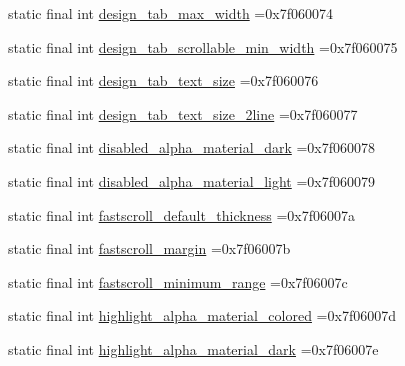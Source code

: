\begin{DoxyCompactItemize}
\item 
static final int \mbox{\hyperlink{classbr_1_1unb_1_1cic_1_1mp_1_1marketmaster_1_1test_1_1R_1_1dimen_ae7b103c763e5dfab15c7117e9487fca4}{design\+\_\+tab\+\_\+max\+\_\+width}} =0x7f060074
\item 
static final int \mbox{\hyperlink{classbr_1_1unb_1_1cic_1_1mp_1_1marketmaster_1_1test_1_1R_1_1dimen_a0eddb231df09cd5f0bbad195decf5a47}{design\+\_\+tab\+\_\+scrollable\+\_\+min\+\_\+width}} =0x7f060075
\item 
static final int \mbox{\hyperlink{classbr_1_1unb_1_1cic_1_1mp_1_1marketmaster_1_1test_1_1R_1_1dimen_a6175e1ce284fd02037c988a3cf335c77}{design\+\_\+tab\+\_\+text\+\_\+size}} =0x7f060076
\item 
static final int \mbox{\hyperlink{classbr_1_1unb_1_1cic_1_1mp_1_1marketmaster_1_1test_1_1R_1_1dimen_a8ba7b38c10c90a08ab5866428f89f3fb}{design\+\_\+tab\+\_\+text\+\_\+size\+\_\+2line}} =0x7f060077
\item 
static final int \mbox{\hyperlink{classbr_1_1unb_1_1cic_1_1mp_1_1marketmaster_1_1test_1_1R_1_1dimen_acdc59e7a84e5751b54adf252bcc1789f}{disabled\+\_\+alpha\+\_\+material\+\_\+dark}} =0x7f060078
\item 
static final int \mbox{\hyperlink{classbr_1_1unb_1_1cic_1_1mp_1_1marketmaster_1_1test_1_1R_1_1dimen_a437d08580416830a700b080831f0d810}{disabled\+\_\+alpha\+\_\+material\+\_\+light}} =0x7f060079
\item 
static final int \mbox{\hyperlink{classbr_1_1unb_1_1cic_1_1mp_1_1marketmaster_1_1test_1_1R_1_1dimen_a45be061e2ba27e9a94a508b78586cd46}{fastscroll\+\_\+default\+\_\+thickness}} =0x7f06007a
\item 
static final int \mbox{\hyperlink{classbr_1_1unb_1_1cic_1_1mp_1_1marketmaster_1_1test_1_1R_1_1dimen_a125e62fc008a3a92e7283d7a49693abe}{fastscroll\+\_\+margin}} =0x7f06007b
\item 
static final int \mbox{\hyperlink{classbr_1_1unb_1_1cic_1_1mp_1_1marketmaster_1_1test_1_1R_1_1dimen_aea0c30685d5018299ffd8128534eea34}{fastscroll\+\_\+minimum\+\_\+range}} =0x7f06007c
\item 
static final int \mbox{\hyperlink{classbr_1_1unb_1_1cic_1_1mp_1_1marketmaster_1_1test_1_1R_1_1dimen_a94dff3d4d15d339b30316625f1db7720}{highlight\+\_\+alpha\+\_\+material\+\_\+colored}} =0x7f06007d
\item 
static final int \mbox{\hyperlink{classbr_1_1unb_1_1cic_1_1mp_1_1marketmaster_1_1test_1_1R_1_1dimen_a373c0dad6e6521919b3c83659ce58455}{highlight\+\_\+alpha\+\_\+material\+\_\+dark}} =0x7f06007e

\end{DoxyCompactItemize}
